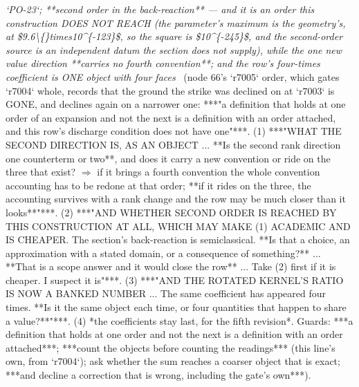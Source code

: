 \begin{description}
\textit{`PO-23`; **second order in the back-reaction** --- and it is an order this construction DOES NOT REACH (the parameter's maximum is the geometry's, at \$9.6\textbackslash\{\}times10\textasciicircum{}\{-123\}\$, so the square is \$10\textasciicircum{}\{-245\}\$, and the second-order source is an independent datum the section does not supply), while the one new value direction **carries no fourth convention**; and the row's four-times coefficient is ONE object with four faces} \ (node 66's `r7005` order, which gates `r7004` whole, records that the ground the strike was declined on at `r7003` is GONE, and declines again on a narrower one: ***"a definition that holds at one order of an expansion and not the next is a definition with an order attached, and this row's discharge condition does not have one"***. (1) ***"WHAT THE SECOND DIRECTION IS, AS AN OBJECT ... **Is the second rank direction one counterterm or two**, and does it carry a new convention or ride on the three that exist?  \ensuremath{\Rightarrow} if it brings a fourth convention the whole convention accounting has to be redone at that order; **if it rides on the three, the accounting survives with a rank change and the row may be much closer than it looks**"***. (2) ***"AND WHETHER SECOND ORDER IS REACHED BY THIS CONSTRUCTION AT ALL, WHICH MAY MAKE (1) ACADEMIC AND IS CHEAPER.  The section's back-reaction is semiclassical.  **Is that a choice, an approximation with a stated domain, or a consequence of something?** ... **That is a scope answer and it would close the row** ... Take (2) first if it is cheaper.  I suspect it is"***. (3) ***"AND THE ROTATED KERNEL'S RATIO IS NOW A BANKED NUMBER ... The same coefficient has appeared four times.  **Is it the same object each time, or four quantities that happen to share a value?**"***. (4) *the coefficients stay last, for the fifth revision*.  Guards: ***a definition that holds at one order and not the next is a definition with an order attached***; ***count the objects before counting the readings*** (this line's own, from `r7004`); ask whether the sum reaches a coarser object that is exact; ***and decline a correction that is wrong, including the gate's own***). 

\end{description}
